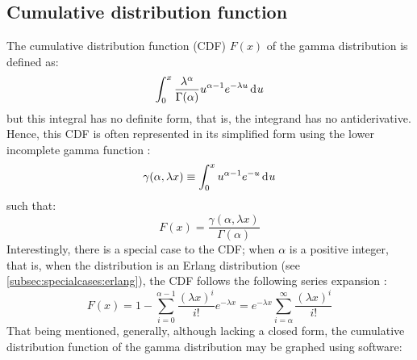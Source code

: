 \documentclass[12pt]{article}
\begin{document}

\pagebreak
\subsection{Cumulative distribution function}\label{subsec:gamma:cdf} The cumulative distribution
function (CDF) $F(x)$ of the gamma distribution is defined as:
\begin{equation}
	\int^x_0\frac{\lambda^\alpha}{\Gamma(\alpha)}u^{\alpha-1}e^{-\lambda u}\mathop{}\!\mathrm{d^{}}u
\end{equation}
but this integral has no definite form, that is, the integrand has no antiderivative. Hence, this CDF is often
represented in its simplified form using the lower incomplete gamma function\cite{weissteinIncompleteGammaFunction} :
\begin{equation}
	\gamma(\alpha, \lambda x)\equiv\int^x_0u^{\alpha-1}e^{-u}\mathop{}\!\mathrm{d^{}}u
\end{equation}
such that:
\begin{equation}
	F(x) = \frac{\gamma(\alpha, \lambda x)}{\Gamma(\alpha)}
\end{equation}
Interestingly, there is a special case to the CDF; when $\alpha$ is a positive integer, that is, when the distribution
is an Erlang distribution (see \autoref{subsec:specialcases:erlang}), the CDF follows the following series expansion
\cite{wikipediaGammaDistribution2022} :
\begin{equation}
	F(x) = 1-\sum^{\alpha-1}_{i=0}\frac{(\lambda x)^i}{i!}e^{-\lambda x} = e^{-\lambda x}\sum^\infty_{i=\alpha}\frac{(\lambda x)^i}{i!}
\end{equation}
That being mentioned, generally, although lacking a closed form, the cumulative distribution function of the gamma
distribution may be graphed using software:

\end{document}
